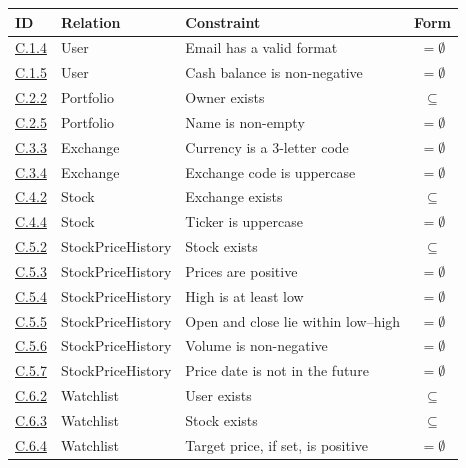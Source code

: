 \documentclass{article}
\newcommand{\cl}[1]{\hyperref[c:#1]{C.#1}}
\begin{document}
\begin{longtable}{@{}l l l c@{}}
\toprule
\textbf{ID} & \textbf{Relation} & \textbf{Constraint} & \textbf{Form} \\
\midrule
\endhead
\cl{1.4}  & User              & Email has a valid format                         & $=\emptyset$ \\
\cl{1.5}  & User              & Cash balance is non-negative                     & $=\emptyset$ \\
\midrule
\cl{2.2}  & Portfolio         & Owner exists                                     & $\subseteq$ \\
\cl{2.5}  & Portfolio         & Name is non-empty                                & $=\emptyset$ \\
\midrule
\cl{3.3}  & Exchange          & Currency is a 3-letter code                      & $=\emptyset$ \\
\cl{3.4}  & Exchange          & Exchange code is uppercase                       & $=\emptyset$ \\
\midrule
\cl{4.2}  & Stock             & Exchange exists                                  & $\subseteq$ \\
\cl{4.4}  & Stock             & Ticker is uppercase                              & $=\emptyset$ \\
\midrule
\cl{5.2}  & StockPriceHistory & Stock exists                                     & $\subseteq$ \\
\cl{5.3}  & StockPriceHistory & Prices are positive                              & $=\emptyset$ \\
\cl{5.4}  & StockPriceHistory & High is at least low                             & $=\emptyset$ \\
\cl{5.5}  & StockPriceHistory & Open and close lie within low--high              & $=\emptyset$ \\
\cl{5.6}  & StockPriceHistory & Volume is non-negative                           & $=\emptyset$ \\
\cl{5.7}  & StockPriceHistory & Price date is not in the future                  & $=\emptyset$ \\
\midrule
\cl{6.2}  & Watchlist         & User exists                                      & $\subseteq$ \\
\cl{6.3}  & Watchlist         & Stock exists                                     & $\subseteq$ \\
\cl{6.4}  & Watchlist         & Target price, if set, is positive                & $=\emptyset$ \\

\end{longtable}
\end{document}
